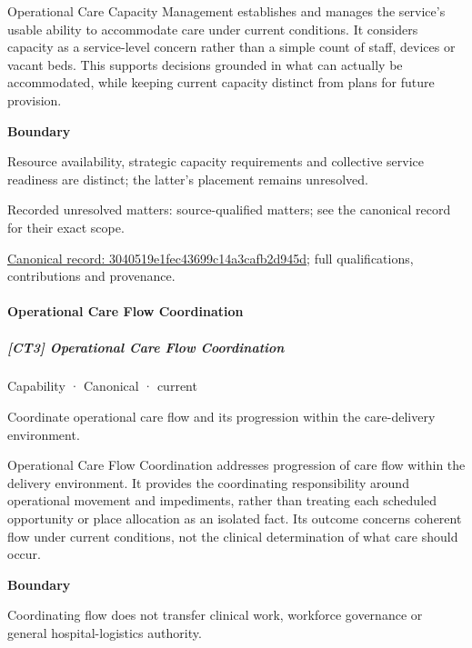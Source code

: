 Operational Care Capacity Management establishes and manages the service's usable ability to accommodate care under current conditions. It considers capacity as a service-level concern rather than a simple count of staff, devices or vacant beds. This supports decisions grounded in what can actually be accommodated, while keeping current capacity distinct from plans for future provision.



\textbf{Boundary}



Resource availability, strategic capacity requirements and collective service readiness are distinct; the latter's placement remains unresolved.


{\small Recorded unresolved matters: source-qualified matters; see the canonical record for their exact scope.}\par
{\footnotesize \href{../../../../continuum/strategy/capability/3040519e1fec43699c14a3cafb2d945d.md}{Canonical record: 3040519e1fec43699c14a3cafb2d945d}; full qualifications, contributions and provenance.}\par
\paragraph{Operational Care Flow Coordination}

\subparagraph{[CT3] Operational Care Flow Coordination}

\label{element:d1dedb10ea694af5b88dbe1b6192f3ac}
{\small Capability · Canonical · current}\par

Coordinate operational care flow and its progression within the care-delivery environment.



Operational Care Flow Coordination addresses progression of care flow within the delivery environment. It provides the coordinating responsibility around operational movement and impediments, rather than treating each scheduled opportunity or place allocation as an isolated fact. Its outcome concerns coherent flow under current conditions, not the clinical determination of what care should occur.



\textbf{Boundary}



Coordinating flow does not transfer clinical work, workforce governance or general hospital-logistics authority.


